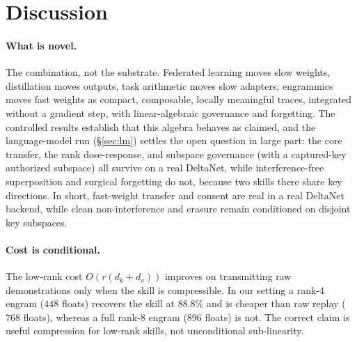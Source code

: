 \documentclass[11pt]{article}
\theoremstyle{definition}
\newcommand{\dk}{d_k}
\newcommand{\dv}{d_v}
\begin{document}
\section{Discussion}
\label{sec:discussion}

\paragraph{What is novel.}
The combination, not the substrate. Federated learning moves slow weights, distillation moves outputs, task arithmetic moves slow adapters; engrammics moves fast weights as compact, composable, locally meaningful traces, integrated without a gradient step, with linear-algebraic governance and forgetting. The controlled results establish that this algebra behaves as claimed, and the language-model run (\S\ref{sec:lm}) settles the open question in large part: the core transfer, the rank dose-response, and subspace governance (with a captured-key authorized subspace) all survive on a real DeltaNet, while interference-free superposition and surgical forgetting do not, because two skills there share key directions. In short, fast-weight transfer and consent are real in a real DeltaNet backend, while clean non-interference and erasure remain conditioned on disjoint key subspaces.

\paragraph{Cost is conditional.}
The low-rank cost $O(r(\dk+\dv))$ improves on transmitting raw demonstrations only when the skill is compressible. In our setting a rank-$4$ engram ($448$ floats) recovers the skill at $88.8\%$ and is cheaper than raw replay ($768$ floats), whereas a full rank-$8$ engram ($896$ floats) is not. The correct claim is useful compression for low-rank skills, not unconditional sub-linearity.
\end{document}
